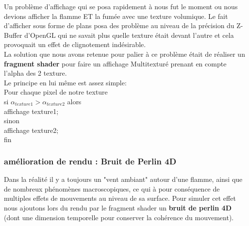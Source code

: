 \documentclass[a4paper,10pt]{article}
\begin{document}
	Un problème d'affichage qui se posa rapidement à nous fut le moment ou nous devions afficher la flamme ET la fumée avec une texture volumique. Le fait d'afficher sous forme de plans posa des problème au niveau de la précision du Z-Buffer d'OpenGL qui ne savait plus quelle texture était devant l'autre et cela provoquait un effet de clignotement indésirable.\\

La solution que nous avons retenue pour palier à ce problème était de réaliser un \textbf{fragment shader} pour faire un affichage Multitexturé prenant en compte l'alpha des 2 texture.\\

Le principe en lui même est assez simple:\\
Pour chaque pixel de notre texture\\
      si $\alpha_{texture1}>\alpha_{texture2}$ alors \\
            affichage texture1;\\
      sinon \\
            affichage texture2;\\
fin\\


\subsubsection{amélioration de rendu : Bruit de Perlin 4D}

Dans la réalité il y a toujours un "vent ambiant" autour d'une flamme, ainsi que de nombreux phénomènes 
macroscopiques, ce qui à pour conséquence de multiples effets de mouvements au niveau de sa surface. Pour simuler cet effet nous ajoutons lors du rendu par le fragment shader un \textbf{bruit de perlin 4D} (dont une dimension temporelle pour conserver la cohérence du mouvement).\\
\end{document}
